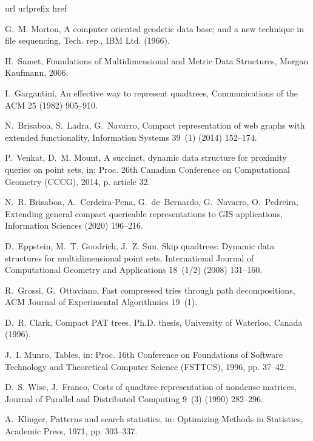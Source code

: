 \documentclass{elsarticle}
\begin{document}
\begin{thebibliography}{10}
\expandafter\ifx\csname url\endcsname\relax
  \def\url#1{\texttt{#1}}\fi
\expandafter\ifx\csname urlprefix\endcsname\relax\def\urlprefix{URL }\fi
\expandafter\ifx\csname href\endcsname\relax
  \def\href#1#2{#2} \def\path#1{#1}\fi

G.~M. Morton, A computer oriented geodetic data base; and a new technique in
  file sequencing, Tech. rep., IBM Ltd. (1966).

H.~Samet, Foundations of Multidimensional and Metric Data Structures, Morgan
  Kaufmann, 2006.

I.~Gargantini, An effective way to represent quadtrees, Communications of the
  ACM 25 (1982) 905--910.

N.~Brisaboa, S.~Ladra, G.~Navarro, Compact representation of web graphs with
  extended functionality, Information Systems 39~(1) (2014) 152--174.

P.~Venkat, D.~M. Mount, A succinct, dynamic data structure for proximity
  queries on point sets, in: Proc. 26th Canadian Conference on Computational
  Geometry (CCCG), 2014, p. article 32.

N.~R. Brisaboa, A.~Cerdeira-Pena, G.~de~Bernardo, G.~Navarro, O.~Pedreira,
  Extending general compact querieable representations to {GIS} applications,
  Information Sciences (2020) 196--216.

D.~Eppstein, M.~T. Goodrich, J.~Z. Sun, Skip quadtrees: Dynamic data structures
  for multidimensional point sets, International Journal of Computational
  Geometry and Applications 18~(1/2) (2008) 131--160.

R.~Grossi, G.~Ottaviano, Fast compressed tries through path decompositions, ACM
  Journal of Experimental Algorithmics 19~(1).

D.~R. Clark, Compact {PAT} trees, Ph.D. thesis, University of Waterloo, Canada
  (1996).

J.~I. Munro, Tables, in: Proc. 16th Conference on Foundations of Software
  Technology and Theoretical Computer Science (FSTTCS), 1996, pp. 37--42.

D.~S. Wise, J.~Franco, Costs of quadtree representation of nondense matrices,
  Journal of Parallel and Distributed Computing 9~(3) (1990) 282--296.

A.~Klinger, Patterns and search statistics, in: Optimizing Methods in
  Statistics, Academic Press, 1971, pp. 303--337.


\end{thebibliography}
\end{document}
